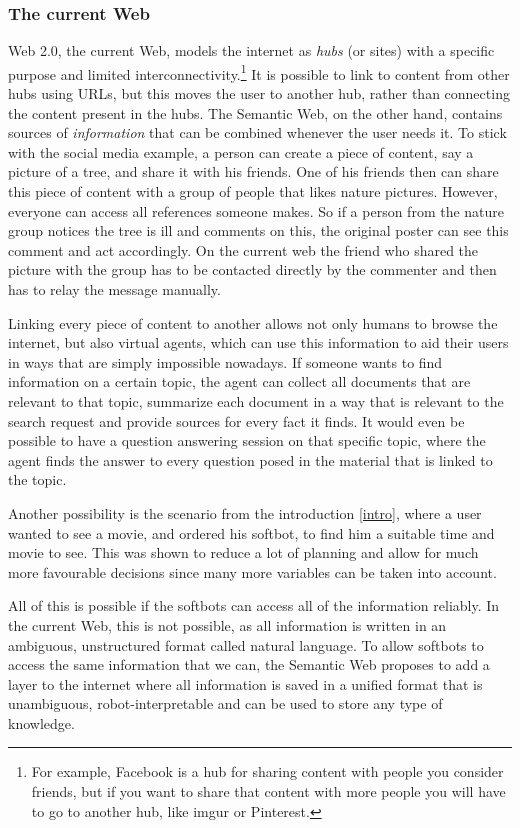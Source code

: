 \documentclass{article}
\begin{document}
 \subsubsection{The current Web}
Web 2.0, the current Web, models the internet as \textit{hubs} (or sites) with a specific purpose and limited interconnectivity.\footnote{For example, Facebook is a hub for sharing content with people you consider friends, but if you want to share that content with more people you will have to go to another hub, like imgur or Pinterest.} It is possible to link to content from other hubs using URLs, but this moves the user to another hub, rather than connecting the content present in the hubs.
The Semantic Web, on the other hand, contains sources of \textit{information} that can be combined whenever the user needs it. To stick with the social media example, a person can create a piece of content, say a picture of a tree, and share it with his friends. One of his friends then can share this piece of content with a group of people that likes nature pictures. However, everyone can access all references someone makes. So if a person from the nature group notices the tree is ill and comments on this, the original poster can see this comment and act accordingly. On the current web the friend who shared the picture with the group has to be contacted directly by the commenter and then has to relay the message manually.

 Linking every piece of content to another allows not only humans to browse the internet, but also virtual agents, which can use this information to aid their users in ways that are simply impossible nowadays. If someone wants to find information on a certain topic, the agent can collect all documents that are relevant to that topic, summarize each document in a way that is relevant to the search request and provide sources for every fact it finds. It would even be possible to have a question answering session on that specific topic, where the agent finds the answer to every question posed in the material that is linked to the topic.

 Another possibility is the scenario from the introduction \ref{intro}, where a user wanted to see a movie, and ordered his softbot, to find him a suitable time and movie to see. This was shown to reduce a lot of planning and allow for much more favourable decisions since many more variables can be taken into account.

 All of this is possible if the softbots can access all of the information reliably. In the current Web, this is not possible, as all information is written in an ambiguous, unstructured format called natural language. To allow softbots to access the same information that we can, the Semantic Web proposes to add a layer to the internet where all information is saved in a unified format that is unambiguous, robot-interpretable and can be used to store any type of knowledge.
 
\end{document}
